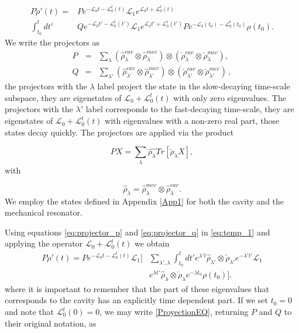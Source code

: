 \documentclass[reprint, amsmath,amssymb, aps,pra]{revtex4-1}
\begin{document}
\begin{align}\label{eq:temp_1}
P\dot{\rho}'(t)=&P e^{-\mathcal{L}_0 t-\mathcal{L}_0^t(t)}\mathcal{L}_1e^{\mathcal{L}_0 t+\mathcal{L}_0^t(t)}\\
\int_{t_0}^{t}dt'&Qe^{-\mathcal{L}_0 t'-\mathcal{L}_0^t(t')}\mathcal{L}_1e^{\mathcal{L}_0 t'+\mathcal{L}_0^t(t')}Pe^{-\mathcal{L}_0(t_0)-\mathcal{L}_0^t(t_0)}\rho(t_0).\nonumber
\end{align} We write the projectors as
\begin{eqnarray}
  P &=& \sum_{\lambda} (\hat{\rho}_{\lambda}^{cav}\otimes\hat{\rho}_{\lambda}^{mec})\otimes(\check{\rho}_{\lambda}^{cav}\otimes\check{\rho}_{\lambda}^{mec}),\label{eq:projector_p}\\
  Q &=& \sum_{\lambda'} (\hat{\rho}_{\lambda'}^{cav}\otimes \hat{\rho}_{\lambda'}^{mec})\otimes(\check{\rho}_{\lambda'}^{cav}\otimes\check{\rho}_{\lambda'}^{mec})\label{eq:projector_q}\, ,
\end{eqnarray}
the projectors with the $\lambda$ label project the state in the
slow-decaying time-scale subspace, they are eigenstates of
$\mathcal{L}_0+\mathcal{L}_0^t(t)$ with only zero eigenvalues. The projectors with the
$\lambda'$ label corresponds to the fast-decaying time-scale, they are
eigenstates of $\mathcal{L}_0+\mathcal{L}_0^t(t)$ with eigenvalues with a non-zero real
part, those states decay quickly. The projectors are applied via the product

\begin{equation}
PX =\sum_\lambda \hat{\rho_{\lambda}}Tr[\check{\rho}_{\lambda}X],
\end{equation} with

\begin{equation}
\hat{\rho}_\lambda = \hat{\rho}_\lambda^{mec} \otimes  \hat{\rho}_\lambda^{cav}.
\end{equation} We employ the states defined in Appendix
\ref{App1} for both the cavity and the mechanical resonator. 

Using equations \eqref{eq:projector_p} and \eqref{eq:projector_q} in
\eqref{eq:temp_1} and applying the operator $\mathcal{L}_0+\mathcal{L}_0^t(t)$ we obtain
\begin{align}\label{ProyectionEQ}
P\dot{\rho}'(t)=P e^{-\mathcal{L}_0 t-\mathcal{L}_0^t(t)}\mathcal{L}_1[&\sum_{\lambda',\lambda}\int_{t_0}^{t}dt'e^{\lambda' t} \hat{\rho}_{\lambda'} \otimes \check{\rho}_{\lambda'}e^{-\lambda' t'}\mathcal{L}_1\\
&e^{\lambda t'}\hat{\rho}_{\lambda} \otimes \check{\rho}_{\lambda} e^{-\lambda t_0}\rho(t_0)]\nonumber.
\end{align} where it is important to remember that the part of these eigenvalues that corresponds to the cavity has an explicitly time dependent part. If we  set $t_0=0$ and note that $\mathcal{L}_0^t(0)=0$, we may write \eqref{ProyectionEQ}, returning $P$ and $Q$ to their original notation, as
\end{document}
